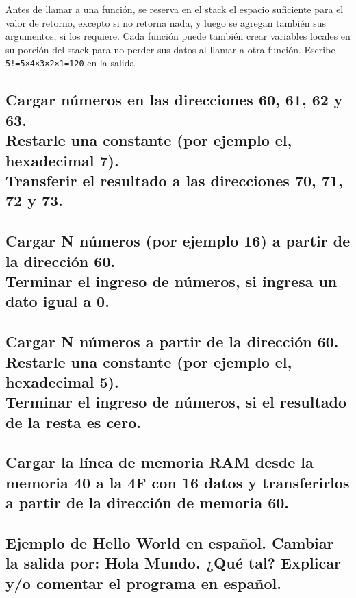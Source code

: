 \documentclass{article}
\begin{document}
Antes de llamar a una función, se reserva en el stack el espacio suficiente para el valor de retorno, excepto si no retorna nada, y luego se agregan también sus argumentos, si los requiere. Cada función puede también crear variables locales en su porción del stack para no perder sus datos al llamar a otra función.
\pagebreak
{}
\pagebreak
{}
Escribe \texttt{5!=5×4×3×2×1=120} en la salida.

\pagebreak
\setcounter{section}{2}
\setcounter{subsection}{0}
\subsection{Cargar números en las direcciones 60, 61, 62 y 63.\\
            Restarle una constante (por ejemplo el, hexadecimal 7).\\
            Transferir el resultado a las direcciones 70, 71, 72 y 73.}

\subsection{Cargar N números (por ejemplo 16) a partir de la dirección 60.\\
            Terminar el ingreso de números, si ingresa un dato igual a 0.}

\subsection{Cargar N números a partir de la dirección 60.\\
            Restarle una constante (por ejemplo el, hexadecimal 5).\\
            Terminar el ingreso de números, si el resultado de la resta es cero.}

\subsection{Cargar la línea de memoria RAM desde la memoria 40 a la 4F con 16 datos y transferirlos a partir de la dirección de memoria 60.}

\pagebreak
\subsection{Ejemplo de Hello World en español. Cambiar la salida por: Hola Mundo. ¿Qué tal? Explicar y/o comentar el programa en español.}
\end{document}
